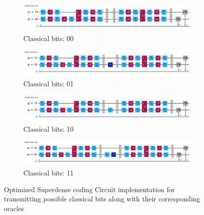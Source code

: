 \documentclass[12pt, oneside]{book}
\theoremstyle{definition}
\theoremstyle{definition}
\theoremstyle{remark}
\begin{document}
\begin{enumerate}
\begin{figure}[H]
        \centering
        \begin{subfigure}[b]{0.45\linewidth}
        \centering
        \includegraphics[width=1\linewidth]{../images/opt_superdense_00.png}
        \caption{Classical bits: 00}
        \label{fig:opt_superdense_00}
        \end{subfigure}
        \hfill
        \centering
        \begin{subfigure}[b]{0.45\linewidth}
        \centering
        \includegraphics[width=1\linewidth]{../images/opt_superdense_01.png}
        \caption{Classical bits: 01}
        \label{fig:opt_superdense_01}
        \end{subfigure}
        \vspace{0.5 cm}
        \begin{subfigure}[b]{0.45\linewidth}
        \centering
        \includegraphics[width=1\linewidth]{../images/opt_superdense_10.png}
        \caption{Classical bits: 10}
        \label{fig:opt_superdense_10}
        \end{subfigure}
        \hfill
        \begin{subfigure}[b]{0.45\textwidth}
        \centering
        \includegraphics[width=1\linewidth]{../images/opt_superdense_11.png}
        \caption{Classical bits: 11}
        \label{fig:opt_superdense_11}
        \end{subfigure}    
        \caption{Optimized Superdense coding Circuit implementation for transmitting possible classical bits along with their corresponding oracles}

\end{figure}
\end{enumerate}
\end{document}
